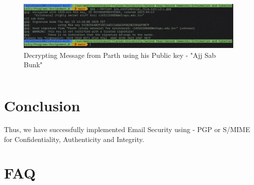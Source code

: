 \documentclass[11pt]{article}
\begin{document}
\begin{figure}[H]
    \centering
    \includegraphics[width=.99\textwidth]{../Programs/Assignment_8/Screenshot_on_2023-04-13_at_12-32-03.png}
    \caption{Decrypting Message from Parth using his Public key - "Ajj Sab Bunk"}
\end{figure}

\begin{verbatim}

\end{verbatim}


% 

\section{Conclusion}
Thus, we have successfully implemented Email Security using - PGP or S/MIME for Confidentiality, Authenticity and Integrity.
\clearpage

\section{FAQ}
\end{document}
